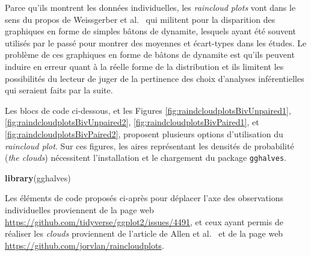 \documentclass[
  french,
]{book}
\newenvironment{Shaded}{\begin{snugshade}}{\end{snugshade}}
\newcommand{\CommentTok}[1]{\textcolor[rgb]{0.56,0.35,0.01}{\textit{#1}}}
\newcommand{\KeywordTok}[1]{\textcolor[rgb]{0.13,0.29,0.53}{\textbf{#1}}}
\newcommand{\NormalTok}[1]{#1}
\newcommand{\OperatorTok}[1]{\textcolor[rgb]{0.81,0.36,0.00}{\textbf{#1}}}
\newcommand{\StringTok}[1]{\textcolor[rgb]{0.31,0.60,0.02}{#1}}
\begin{document}
Parce qu'ils montrent les données individuelles, les \emph{raincloud plots} vont dans le sens du propos de Weissgerber et al.~\autocite*{weissgerberBarLineGraphs2015} qui militent pour la disparition des graphiques en forme de simples bâtons de dynamite, lesquels ayant été souvent utilisés par le passé pour montrer des moyennes et écart-types dans les études. Le problème de ces graphiques en forme de bâtons de dynamite est qu'ils peuvent induire en erreur quant à la réelle forme de la distribution et ils limitent les possibilités du lecteur de juger de la pertinence des choix d'analyses inférentielles qui seraient faits par la suite.

Les blocs de code ci-dessous, et les Figures \ref{fig:raindcloudplotsBivUnpaired1}, \ref{fig:raindcloudplotsBivUnpaired2}, \ref{fig:raindcloudplotsBivPaired1}, et \ref{fig:raindcloudplotsBivPaired2}, proposent plusieurs options d'utilisation du \emph{raincloud plot}. Sur ces figures, les aires représentant les densités de probabilité (\emph{the clouds}) nécessitent l'installation et le chargement du package \texttt{gghalves}.

\begin{Shaded}
\begin{Highlighting}[]
\KeywordTok{library}\NormalTok{(gghalves)}
\end{Highlighting}
\end{Shaded}

Les éléments de code proposés ci-après pour déplacer l'axe des observations individuelles proviennent de la page web \url{https://github.com/tidyverse/ggplot2/issues/4491}, et ceux ayant permis de réaliser les \emph{clouds} proviennent de l'article de Allen et al.~\autocite{allenRaincloudPlotsMultiplatform2019} et de la page web \url{https://github.com/jorvlan/raincloudplots}.

\begin{Shaded}
\end{Shaded}
\end{document}
